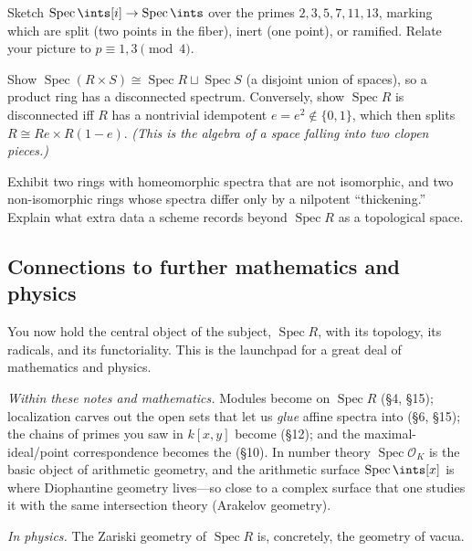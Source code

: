 \documentclass[11pt]{article}
\DeclareMathOperator{\Spec}{Spec}
\begin{document}
\begin{xca}
Sketch $\Spec\ints[i]\to\Spec\ints$ over the primes $2,3,5,7,11,13$, marking which are split
(two points in the fiber), inert (one point), or ramified. Relate your picture to
$p\equiv 1,3\pmod 4$.
\end{xca}

\begin{xca}
Show $\Spec(R\times S)\cong\Spec R\sqcup\Spec S$ (a disjoint union of spaces), so a product
ring has a disconnected spectrum. Conversely, show $\Spec R$ is disconnected iff $R$ has a
nontrivial idempotent $e=e^2\notin\{0,1\}$, which then splits $R\cong Re\times R(1-e)$.
\emph{(This is the algebra of a space falling into two clopen pieces.)}
\end{xca}

\begin{xca}
Exhibit two rings with homeomorphic spectra that are not isomorphic, and two non-isomorphic
rings whose spectra differ only by a nilpotent ``thickening.'' Explain what extra data a
scheme records beyond $\Spec R$ as a topological space.
\end{xca}

\subsection{Connections to further mathematics and physics}

You now hold the central object of the subject, $\Spec R$, with its topology, its radicals, and
its functoriality. This is the launchpad for a great deal of mathematics and physics.

\emph{Within these notes and mathematics.} Modules become  on
$\Spec R$ (\S4, \S15); localization carves out the open sets that let us \emph{glue} affine
spectra into  (\S6, \S15); the chains of primes you saw in $k[x,y]$ become
 (\S12); and the maximal-ideal/point correspondence becomes the
 (\S10). In number theory $\Spec\mathcal{O}_K$ is the basic object of
arithmetic geometry, and the arithmetic surface $\Spec\ints[x]$ is where Diophantine geometry
lives---so close to a complex surface that one studies it with the same intersection theory
(Arakelov geometry).

\emph{In physics.} The Zariski geometry of $\Spec R$ is, concretely, the geometry of vacua.
\end{document}
